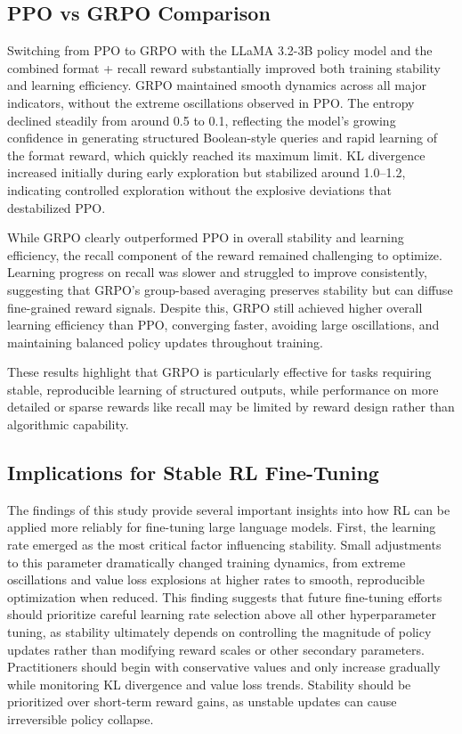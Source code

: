 \subsection{PPO vs GRPO Comparison}
Switching from PPO to GRPO with the LLaMA 3.2-3B policy model and the combined format + recall reward substantially improved both training stability and learning efficiency. GRPO maintained smooth dynamics across all major indicators,  without the extreme oscillations observed in PPO. The entropy declined steadily from around 0.5 to 0.1, reflecting the model’s growing confidence in generating structured Boolean-style queries and rapid learning of the format reward, which quickly reached its maximum limit. KL divergence increased initially during early exploration but stabilized around 1.0–1.2, indicating controlled exploration without the explosive deviations that destabilized PPO.

While GRPO clearly outperformed PPO in overall stability and learning efficiency, the recall component of the reward remained challenging to optimize. Learning progress on recall was slower and struggled to improve consistently, suggesting that GRPO’s group-based averaging preserves stability but can diffuse fine-grained reward signals. Despite this, GRPO still achieved higher overall learning efficiency than PPO, converging faster, avoiding large oscillations, and maintaining balanced policy updates throughout training.

These results highlight that GRPO is particularly effective for tasks requiring stable, reproducible learning of structured outputs, while performance on more detailed or sparse rewards like recall may be limited by reward design rather than algorithmic capability.

\subsection{Implications for Stable RL Fine-Tuning}
The findings of this study provide several important insights into how RL can be applied more reliably for fine-tuning large language models. First, the learning rate emerged as the most critical factor influencing stability. Small adjustments to this parameter dramatically changed training dynamics, from extreme oscillations and value loss explosions at higher rates to smooth, reproducible optimization when reduced. This finding suggests that future fine-tuning efforts should prioritize careful learning rate selection above all other hyperparameter tuning, as stability ultimately depends on controlling the magnitude of policy updates rather than modifying reward scales or other secondary parameters. Practitioners should begin with conservative values and only increase gradually while monitoring KL divergence and value loss trends. Stability should be prioritized over short-term reward gains, as unstable updates can cause irreversible policy collapse.

